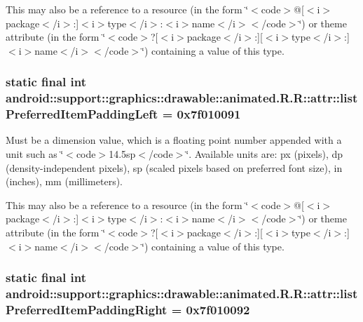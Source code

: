 This may also be a reference to a resource (in the form \char`\"{}$<$code$>$@\mbox{[}$<$i$>$package$<$/i$>$:\mbox{]}$<$i$>$type$<$/i$>$:$<$i$>$name$<$/i$>$$<$/code$>$\char`\"{}) or theme attribute (in the form \char`\"{}$<$code$>$?\mbox{[}$<$i$>$package$<$/i$>$:\mbox{]}\mbox{[}$<$i$>$type$<$/i$>$:\mbox{]}$<$i$>$name$<$/i$>$$<$/code$>$\char`\"{}) containing a value of this type. \hypertarget{classandroid_1_1support_1_1graphics_1_1drawable_1_1animated_1_1_r_1_1attr_1a60e0ab3ddb07bbd0e96ec6a4e09eee}{
\subsubsection[{listPreferredItemPaddingLeft}]{\setlength{\rightskip}{0pt plus 5cm}static final int android::support::graphics::drawable::animated.R.R::attr::listPreferredItemPaddingLeft = 0x7f010091}}
\label{classandroid_1_1support_1_1graphics_1_1drawable_1_1animated_1_1_r_1_1attr_1a60e0ab3ddb07bbd0e96ec6a4e09eee}


Must be a dimension value, which is a floating point number appended with a unit such as \char`\"{}$<$code$>$14.5sp$<$/code$>$\char`\"{}. Available units are: px (pixels), dp (density-independent pixels), sp (scaled pixels based on preferred font size), in (inches), mm (millimeters). 

This may also be a reference to a resource (in the form \char`\"{}$<$code$>$@\mbox{[}$<$i$>$package$<$/i$>$:\mbox{]}$<$i$>$type$<$/i$>$:$<$i$>$name$<$/i$>$$<$/code$>$\char`\"{}) or theme attribute (in the form \char`\"{}$<$code$>$?\mbox{[}$<$i$>$package$<$/i$>$:\mbox{]}\mbox{[}$<$i$>$type$<$/i$>$:\mbox{]}$<$i$>$name$<$/i$>$$<$/code$>$\char`\"{}) containing a value of this type. \hypertarget{classandroid_1_1support_1_1graphics_1_1drawable_1_1animated_1_1_r_1_1attr_766d436f45af99a902b627c8639fa0e0}{
\subsubsection[{listPreferredItemPaddingRight}]{\setlength{\rightskip}{0pt plus 5cm}static final int android::support::graphics::drawable::animated.R.R::attr::listPreferredItemPaddingRight = 0x7f010092}}
\label{classandroid_1_1support_1_1graphics_1_1drawable_1_1animated_1_1_r_1_1attr_766d436f45af99a902b627c8639fa0e0}



